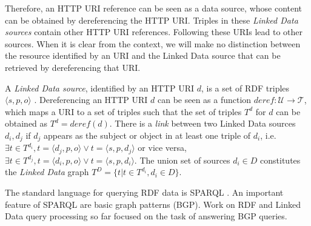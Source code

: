 Therefore, an HTTP URI reference can be seen as a data source, whose
content can be obtained by dereferencing the HTTP URI. Triples in
these \emph{Linked Data sources} contain other HTTP URI
references. Following these URIs lead to other sources. When it is
clear from the context, we will make no distinction between the
resource identified by an URI and the Linked Data source that can be
retrieved by dereferencing that URI.

\begin{definition}
  A \emph{Linked Data source}, identified by an HTTP URI $d$, is a set
  of RDF triples $\langle s,p,o \rangle$ . Dereferencing an HTTP URI
  $d$ can be seen as a function $deref : \mathcal{U} \rightarrow
  \mathcal{T}$, which maps a URI to a set of triples such that the set
  of triples $T^d$ for $d$ can be obtained as $T^d =
  \mathit{deref}(d)$. There is a \emph{link} between two Linked Data
  sources $d_i, d_j$ if $d_j$ appears as the subject or object in at
  least one triple of $d_i$, i.e. $\exists t\in T^{d_i},t=\langle
  d_j,p,o \rangle \vee t=\langle s,p,d_j \rangle$ or vice versa,
  $\exists t\in T^{d_j},t=\langle d_i,p,o \rangle \vee t=\langle
  s,p,d_i \rangle$. The union set of sources $d_i \in D$ constitutes
  the \emph{Linked Data} graph $T^D=\{t| t \in T^{d_i}, d_i \in D\}$.

\end{definition}

The standard language for querying RDF data is SPARQL
\cite{prudhommeaux_sparql_2008}. An important feature of SPARQL are
basic graph patterns (BGP). Work on RDF and Linked Data query
processing so far focused on the task of answering BGP queries.%


